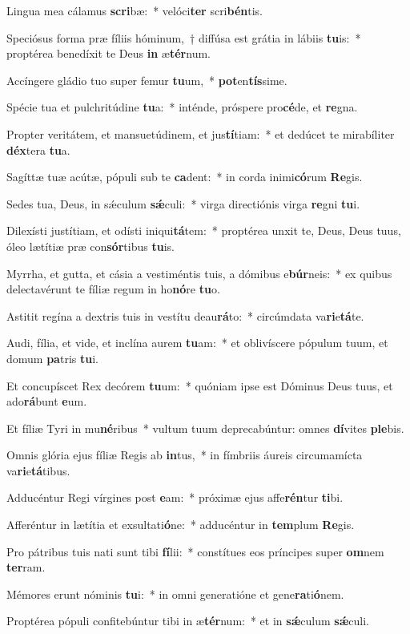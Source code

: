 \item Lingua mea cálamus \textbf{scri}bæ:~* velóci\textbf{ter} scri\textbf{bén}tis.
\item Speciósus forma præ fíliis hóminum,~† diffúsa est grátia in lábiis \textbf{tu}is:~* proptérea benedíxit te Deus \textbf{in} æ\textbf{tér}num.
\item Accíngere gládio tuo super femur \textbf{tu}um,~* \textbf{pot}en\textbf{tís}sime.
\item Spécie tua et pulchritúdine \textbf{tu}a:~* inténde, próspere pro\textbf{cé}de, et \textbf{re}gna.
\item Propter veritátem, et mansuetúdinem, et jus\textbf{tí}tiam:~* et dedúcet te mirabíliter \textbf{déx}tera \textbf{tu}a.
\item Sagíttæ tuæ acútæ, pópuli sub te \textbf{ca}dent:~* in corda inimi\textbf{có}rum \textbf{Re}gis.
\item Sedes tua, Deus, in sǽculum \textbf{sǽ}culi:~* virga directiónis virga \textbf{re}gni \textbf{tu}i.
\item Dilexísti justítiam, et odísti iniqui\textbf{tá}tem:~* proptérea unxit te, Deus, Deus tuus, óleo lætítiæ præ con\textbf{sór}tibus \textbf{tu}is.
\item Myrrha, et gutta, et cásia a vestiméntis tuis, a dómibus e\textbf{búr}neis:~* ex quibus delectavérunt te fíliæ regum in ho\textbf{nó}re \textbf{tu}o.
\item Astitit regína a dextris tuis in vestítu deau\textbf{rá}to:~* circúmdata va\textbf{ri}e\textbf{tá}te.
\item Audi, fília, et vide, et inclína aurem \textbf{tu}am:~* et oblivíscere pópulum tuum, et domum \textbf{pa}tris \textbf{tu}i.
\item Et concupíscet Rex decórem \textbf{tu}um:~* quóniam ipse est Dóminus Deus tuus, et ado\textbf{rá}bunt \textbf{e}um.
\item Et fíliæ Tyri in mu\textbf{né}ribus~* vultum tuum deprecabúntur: omnes \textbf{dí}vites \textbf{ple}bis.
\item Omnis glória ejus fíliæ Regis ab \textbf{in}tus,~* in fímbriis áureis circumamícta va\textbf{ri}e\textbf{tá}tibus.
\item Adducéntur Regi vírgines post \textbf{e}am:~* próximæ ejus affe\textbf{rén}tur \textbf{ti}bi.
\item Afferéntur in lætítia et exsultati\textbf{ó}ne:~* adducéntur in \textbf{tem}plum \textbf{Re}gis.
\item Pro pátribus tuis nati sunt tibi \textbf{fí}lii:~* constítues eos príncipes super \textbf{om}nem \textbf{ter}ram.
\item Mémores erunt nóminis \textbf{tu}i:~* in omni generatióne et gene\textbf{ra}ti\textbf{ó}nem.
\item Proptérea pópuli confitebúntur tibi in æ\textbf{tér}num:~* et in \textbf{sǽ}culum \textbf{sǽ}culi.
